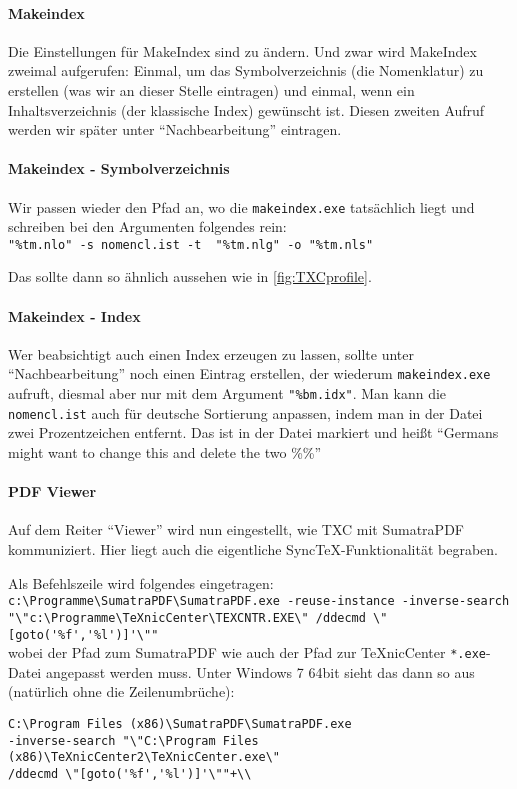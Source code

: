 \paragraph{Makeindex}
Die Einstellungen für MakeIndex sind zu ändern. Und zwar wird MakeIndex zweimal aufgerufen: Einmal, um das Symbolverzeichnis (die Nomenklatur) zu erstellen (was wir an dieser Stelle eintragen) und einmal, wenn ein Inhaltsverzeichnis (der klassische Index) gewünscht ist. Diesen zweiten Aufruf werden wir später unter \enquote{Nachbearbeitung} eintragen.

\paragraph{Makeindex - Symbolverzeichnis}
Wir passen wieder den Pfad an, wo die \texttt{makeindex.exe} tatsächlich liegt und schreiben bei den Argumenten folgendes rein:\\
\verb+"%tm.nlo" -s nomencl.ist -t  "%tm.nlg" -o "%tm.nls"+

Das sollte dann so ähnlich aussehen wie in \ref{fig:TXCprofile}.

\paragraph{Makeindex - Index}
Wer beabsichtigt auch einen Index erzeugen zu lassen, sollte unter \enquote{Nachbearbeitung} noch einen Eintrag erstellen, der wiederum \texttt{makeindex.exe} aufruft, diesmal aber nur mit dem Argument \verb+"%bm.idx"+.
Man kann die \texttt{nomencl.ist} auch für deutsche Sortierung anpassen, indem man in der Datei zwei Prozentzeichen entfernt. Das ist in der Datei markiert und heißt \enquote{Germans might want to change this and delete the two \%\%}

\paragraph{PDF Viewer}
Auf dem Reiter \enquote{Viewer} wird nun eingestellt, wie TXC mit SumatraPDF kommuniziert. Hier liegt auch die eigentliche Sync\TeX-Funktionalität begraben.

Als Befehlszeile wird folgendes eingetragen:\\
{\tiny \verb+c:\Programme\SumatraPDF\SumatraPDF.exe -reuse-instance -inverse-search "\"c:\Programme\TeXnicCenter\TEXCNTR.EXE\" /ddecmd \"[goto('%f','%l')]'\""+\\}
wobei der Pfad zum SumatraPDF wie auch der Pfad zur TeXnicCenter \texttt{*.exe}-Datei angepasst werden muss.
Unter Windows 7 64bit sieht das dann \zb so aus (natürlich ohne die Zeilenumbrüche):\\
{\scriptsize \begin{verbatim}
C:\Program Files (x86)\SumatraPDF\SumatraPDF.exe
-inverse-search "\"C:\Program Files (x86)\TeXnicCenter2\TeXnicCenter.exe\"
/ddecmd \"[goto('%f','%l')]'\""+\\
\end{verbatim}
}

